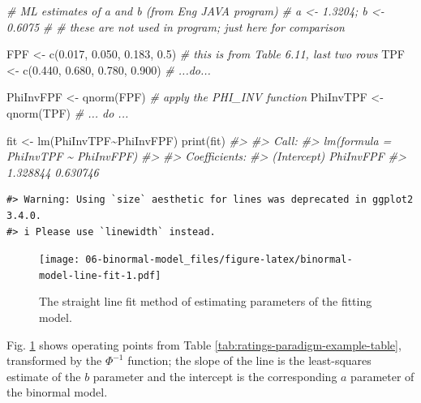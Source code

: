 \documentclass[
]{book}
\newenvironment{Shaded}{\begin{snugshade}}{\end{snugshade}}
\newcommand{\CommentTok}[1]{\textcolor[rgb]{0.56,0.35,0.01}{\textit{#1}}}
\newcommand{\FloatTok}[1]{\textcolor[rgb]{0.00,0.00,0.81}{#1}}
\newcommand{\FunctionTok}[1]{\textcolor[rgb]{0.00,0.00,0.00}{#1}}
\newcommand{\NormalTok}[1]{#1}
\newcommand{\OtherTok}[1]{\textcolor[rgb]{0.56,0.35,0.01}{#1}}
\newcommand{\SpecialCharTok}[1]{\textcolor[rgb]{0.00,0.00,0.00}{#1}}
\begin{document}
\begin{Shaded}
\begin{Highlighting}[]
\CommentTok{\# ML estimates of a and b (from Eng JAVA program)}
\CommentTok{\# a \textless{}{-} 1.3204; b \textless{}{-} 0.6075 }
\CommentTok{\# \# these are not used in program; just here for comparison}

\NormalTok{FPF }\OtherTok{\textless{}{-}} \FunctionTok{c}\NormalTok{(}\FloatTok{0.017}\NormalTok{, }\FloatTok{0.050}\NormalTok{, }\FloatTok{0.183}\NormalTok{, }\FloatTok{0.5}\NormalTok{)  }
\CommentTok{\# this is from Table 6.11, last two rows}
\NormalTok{TPF }\OtherTok{\textless{}{-}} \FunctionTok{c}\NormalTok{(}\FloatTok{0.440}\NormalTok{, }\FloatTok{0.680}\NormalTok{, }\FloatTok{0.780}\NormalTok{, }\FloatTok{0.900}\NormalTok{)}
\CommentTok{\# ...do...}

\NormalTok{PhiInvFPF }\OtherTok{\textless{}{-}} \FunctionTok{qnorm}\NormalTok{(FPF)}
\CommentTok{\# apply the PHI\_INV function}
\NormalTok{PhiInvTPF }\OtherTok{\textless{}{-}} \FunctionTok{qnorm}\NormalTok{(TPF)}
\CommentTok{\# ... do ... }

\NormalTok{fit }\OtherTok{\textless{}{-}} \FunctionTok{lm}\NormalTok{(PhiInvTPF}\SpecialCharTok{\textasciitilde{}}\NormalTok{PhiInvFPF)}
\FunctionTok{print}\NormalTok{(fit)}
\CommentTok{\#\textgreater{} }
\CommentTok{\#\textgreater{} Call:}
\CommentTok{\#\textgreater{} lm(formula = PhiInvTPF \textasciitilde{} PhiInvFPF)}
\CommentTok{\#\textgreater{} }
\CommentTok{\#\textgreater{} Coefficients:}
\CommentTok{\#\textgreater{} (Intercept)    PhiInvFPF  }
\CommentTok{\#\textgreater{}    1.328844     0.630746}
\end{Highlighting}
\end{Shaded}

\begin{verbatim}
#> Warning: Using `size` aesthetic for lines was deprecated in ggplot2 3.4.0.
#> i Please use `linewidth` instead.
\end{verbatim}

\begin{figure}
\centering
\texttt{[image: 06-binormal-model\_files/figure-latex/binormal-model-line-fit-1.pdf]}
\caption{\label{fig:binormal-model-line-fit}The straight line fit method of estimating parameters of the fitting model.}
\end{figure}

Fig. \ref{fig:binormal-model-line-fit} shows operating points from Table \ref{tab:ratings-paradigm-example-table}, transformed by the \(\Phi^{-1}\) function; the slope of the line is the least-squares estimate of the \(b\) parameter and the intercept is the corresponding \(a\) parameter of the binormal model.
\end{document}
